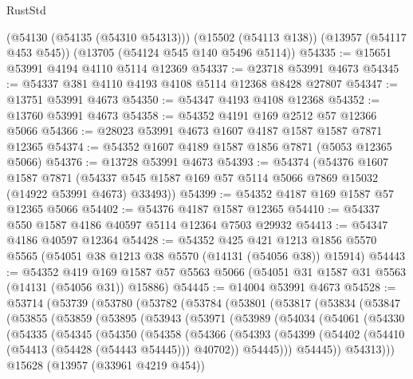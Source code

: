 \begin{lexlean}{RustStd}
\begin{coremodule}
    (@54130 (@54135 (@54310 @54313)))
    (@15502 (@54113 @138))
    (@13957 (@54117 @453 @545))
    (@13705 (@54124 @545 @140 @5496 @5114))
@54335 := @15651 @53991 @4194 @4110 @5114 @12369
@54337 := @23718 @53991 @4673
@54345 := @54337 @381 @4110 @4193 @4108 @5114 @12368 @8428 @27807
@54347 := @13751 @53991 @4673
@54350 := @54347 @4193 @4108 @12368
@54352 := @13760 @53991 @4673
@54358 := @54352 @4191 @169 @2512 @57 @12366 @5066
@54366 := @28023 @53991 @4673 @1607 @4187 @1587 @1587 @7871 @12365
@54374 := @54352 @1607 @4189 @1587 @1856 @7871 (@5053 @12365 @5066)
@54376 := @13728 @53991 @4673
@54393 := @54374
    (@54376
      @1607
      @1587
      @7871
      (@54337 @545 @1587 @169 @57 @5114 @5066 @7869 @15032 (@14922 @53991 @4673) @33493))
@54399 := @54352 @4187 @169 @1587 @57 @12365 @5066
@54402 := @54376 @4187 @1587 @12365
@54410 := @54337 @550 @1587 @4186 @40597 @5114 @12364 @7503 @29932
@54413 := @54347 @4186 @40597 @12364
@54428 := @54352
    @425
    @421
    @1213
    @1856
    @5570
    @5565
    (@54051 @38 @1213 @38 @5570 (@14131 (@54056 @38)) @15914)
@54443 := @54352
    @419
    @169
    @1587
    @57
    @5563
    @5066
    (@54051 @31 @1587 @31 @5563 (@14131 (@54056 @31)) @15886)
@54445 := @14004 @53991 @4673
@54528 := @53714
    (@53739
      (@53780
        (@53782
          (@53784
            (@53801
              (@53817
                (@53834
                  (@53847
                    (@53855
                      (@53859
                        (@53895
                          (@53943
                            (@53971
                              (@53989
                                (@54034
                                  (@54061
                                    (@54330
                                      (@54335
                                        (@54345
                                          (@54350
                                            (@54358
                                              (@54366
                                                (@54393
                                                  (@54399
                                                    (@54402
                                                      (@54410
                                                        (@54413 (@54428 (@54443 @54445)))
                                                        @40702))
                                                    @54445)))
                                              @54445))
                                          @54313)))
                                    @15628
                                    (@13957 (@33961 @4219 @454))

\end{coremodule}
\end{lexlean}
